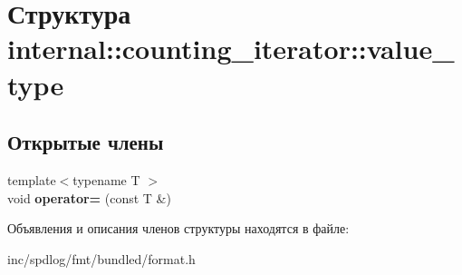 \hypertarget{structinternal_1_1counting__iterator_1_1value__type}{}\section{Структура internal\+:\+:counting\+\_\+iterator\+:\+:value\+\_\+type}
\label{structinternal_1_1counting__iterator_1_1value__type}
\subsection*{Открытые члены}
\begin{DoxyCompactItemize}
\item 
\mbox{\label{structinternal_1_1counting__iterator_1_1value__type_a9f725eb93b52595e1ccf860e7ee15a2e}} 
{\footnotesize template$<$typename T $>$ }\\void {\bfseries operator=} (const T \&)
\end{DoxyCompactItemize}


Объявления и описания членов структуры находятся в файле\+:\begin{DoxyCompactItemize}
\item 
inc/spdlog/fmt/bundled/format.\+h\end{DoxyCompactItemize}
